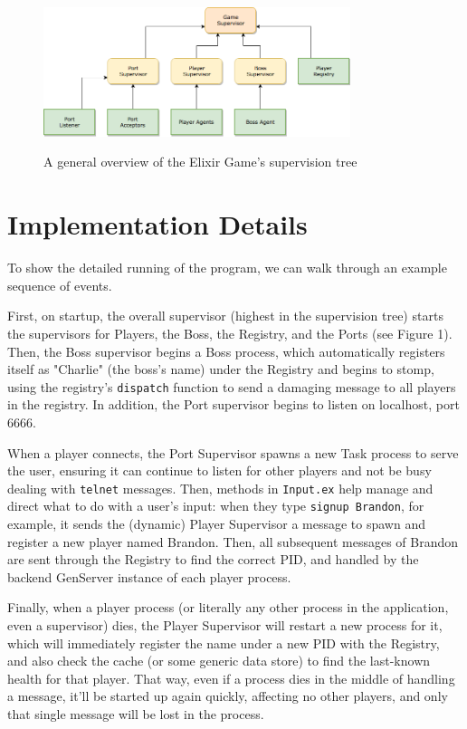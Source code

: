 \documentclass[letterpaper]{article}
\begin{document}
	\begin{figure}[ht]
		\centering
		\includegraphics[width=0.8\textwidth]{Diagram}
		\\[1.5em]
		\caption{A general overview of the Elixir Game's supervision tree}
		\label{fig:mesh1}
		\vspace*{12pt}
	\end{figure}

	\section{Implementation Details}

	To show the detailed running of the program, we can walk through an example sequence of events.

	First, on startup, the overall supervisor (highest in the supervision tree) starts the supervisors for Players, the Boss, the Registry, and the Ports (see Figure 1). Then, the Boss supervisor begins a Boss process, which automatically registers itself as "Charlie" (the boss's name) under the Registry and begins to stomp, using the registry's \texttt{dispatch} function to send a damaging message to all players in the registry. In addition, the Port supervisor begins to listen on localhost, port 6666. 

	When a player connects, the Port Supervisor spawns a new Task process to serve the user, ensuring it can continue to listen for other players and not be busy dealing with \texttt{telnet} messages. Then, methods in \texttt{Input.ex} help manage and direct what to do with a user's input: when they type \texttt{signup Brandon}, for example, it sends the (dynamic) Player Supervisor a message to spawn and register a new player named Brandon. Then, all subsequent messages of Brandon are sent through the Registry to find the correct PID, and handled by the backend GenServer instance of each player process.

	Finally, when a player process (or literally any other process in the application, even a supervisor) dies, the Player Supervisor will restart a new process for it, which will immediately register the name under a new PID with the Registry, and also check the cache (or some generic data store) to find the last-known health for that player. That way, even if a process dies in the middle of handling a message, it'll be started up again quickly, affecting no other players, and only that single message will be lost in the process.
\end{document}
